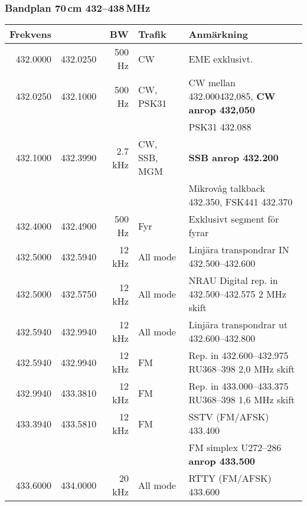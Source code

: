 \subsubsection{Bandplan 70\,cm 432--438\,MHz}
\begin{tabular}{rrrll}
	\textbf{Frekvens} &          & \textbf{BW} & \textbf{Trafik} & \textbf{Anmärkning}                                         \\ \hline
	
	
432.0000 & 432.0250 & 500 Hz  & CW           & EME exklusivt.                                               \\ \hline
432.0250 & 432.1000 & 500 Hz  & CW, PSK31    & CW mellan \num{432,000}{432,085}, \textbf{CW anrop 432,050}  \\
         &          &         &              & PSK31 \num{432,088}                                          \\ \hline
432.1000 & 432.3990 & 2.7 kHz & CW, SSB, MGM & \textbf{SSB anrop \num{432,200}}                             \\
         &          &         &              & Mikrovåg talkback \num{432,350}, FSK441 \num{432,370}        \\ \hline
432.4000 & 432.4900 & 500 Hz  & Fyr          & Exklusivt segment för fyrar                                  \\ \hline
432.5000 & 432.5940 & 12 kHz  & All mode     & Linjära transpondrar IN \numrange{432,500}{432,600}          \\ \hline
432.5000 & 432.5750 & 12 kHz  & All mode     & NRAU Digital rep. in \numrange{432,500}{432,575} 2 MHz skift \\ \hline
432.5940 & 432.9940 & 12 kHz  & All mode     & Linjära transpondrar ut \numrange{432,600}{432,800}          \\ \hline
432.5940 & 432.9940 & 12 kHz  & FM           & Rep. in \numrange{432,600}{432,975} RU368--398 2,0 MHz skift \\ \hline
432.9940 & 433.3810 & 12 kHz  & FM           & Rep. in \numrange{433,000}{433,375} RU368--398 1,6 MHz skift \\ \hline
433.3940 & 433.5810 & 12 kHz  & FM           & SSTV (FM/AFSK) \num{433,400}                                 \\
         &          &         &              & FM simplex U272--286 \textbf{anrop \num{433,500}}            \\ \hline
433.6000 & 434.0000 & 20 kHz  & All mode     & RTTY (FM/AFSK) \num{433,600}                                 \\

\end{tabular}

